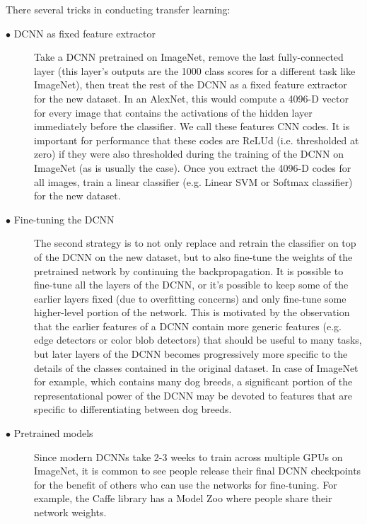 There several tricks in conducting transfer learning:
\begin{description}
	\item[$\bullet$ DCNN as fixed feature extractor] \noindent Take a DCNN pretrained on ImageNet, remove the last fully-connected layer (this layer’s outputs are the 1000 class scores for a different task like ImageNet), then treat the rest of the DCNN as a fixed feature extractor for the new dataset. In an AlexNet, this would compute a 4096-D vector for every image that contains the activations of the hidden layer immediately before the classifier. We call these features CNN codes. It is important for performance that these codes are ReLUd (i.e. thresholded at zero) if they were also thresholded during the training of the DCNN on ImageNet (as is usually the case). Once you extract the 4096-D codes for all images, train a linear classifier (e.g. Linear SVM or Softmax classifier) for the new dataset. 
	\item[$\bullet$ Fine-tuning the DCNN] \noindent The second strategy is to not only replace and retrain the classifier on top of the DCNN on the new dataset, but to also fine-tune the weights of the pretrained network by continuing the backpropagation. It is possible to fine-tune all the layers of the DCNN, or it’s possible to keep some of the earlier layers fixed (due to overfitting concerns) and only fine-tune some higher-level portion of the network. This is motivated by the observation that the earlier features of a DCNN contain more generic features (e.g. edge detectors or color blob detectors) that should be useful to many tasks, but later layers of the DCNN becomes progressively more specific to the details of the classes contained in the original dataset. In case of ImageNet for example, which contains many dog breeds, a significant portion of the representational power of the DCNN may be devoted to features that are specific to differentiating between dog breeds.
	\item[$\bullet$ Pretrained models] \noindent  Since modern DCNNs take 2-3 weeks to train across multiple GPUs on ImageNet, it is common to see people release their final DCNN checkpoints for the benefit of others who can use the networks for fine-tuning. For example, the Caffe library has a Model Zoo where people share their network weights.
\end{description}



